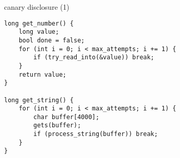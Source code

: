 \begin{frame}[fragile]{canary disclosure (1)}
\begin{Verbatim}[fontsize=\fontsize{9}{10}]
long get_number() {
    long value;
    bool done = false;
    for (int i = 0; i < max_attempts; i += 1) {
        if (try_read_into(&value)) break;
    }
    return value;
}

long get_string() {
    for (int i = 0; i < max_attempts; i += 1) {
        char buffer[4000];
        gets(buffer);
        if (process_string(buffer)) break;
    }
}
\end{Verbatim}
\end{frame}
